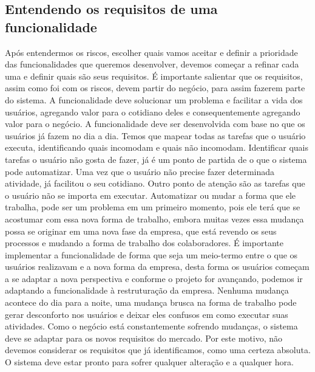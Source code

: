       \subsection{Entendendo os requisitos de uma funcionalidade}
        Após entendermos os riscos, escolher quais vamos aceitar e definir a prioridade
        das funcionalidades que queremos desenvolver, devemos começar a refinar cada
        uma e definir quais são seus requisitos. É importante salientar que os
        requisitos, assim como foi com os riscos, devem partir do negócio, para assim
        fazerem parte do sistema. A funcionalidade deve solucionar um problema e facilitar
        a vida dos usuários, agregando valor para o cotidiano deles e consequentemente
        agregando valor para o negócio. \newline
        A funcionalidade deve ser desenvolvida com base no que os usuários já fazem
        no dia a dia. Temos que mapear todas as tarefas que o usuário executa,
        identificando quais incomodam e quais não incomodam. Identificar quais tarefas
        o usuário não gosta de fazer, já é um ponto de partida de o que o sistema pode
        automatizar. Uma vez que o usuário não precise fazer determinada atividade,
        já facilitou o seu cotidiano. Outro ponto de atenção são as tarefas que
        o usuário não se importa em executar. Automatizar ou mudar a forma que ele
        trabalha, pode ser um problema em um primeiro momento, pois ele terá que
        se acostumar com essa nova forma de trabalho, embora muitas vezes essa mudança
        possa se originar em uma nova fase da empresa, que está revendo os seus processos
        e mudando a forma de trabalho dos colaboradores. É importante implementar
        a funcionalidade de forma que seja um meio-termo entre o que os usuários
        realizavam e a nova forma da empresa, desta forma os usuários começam a
        se adaptar a nova perspectiva e conforme o projeto for avançando, podemos
        ir adaptando a funcionalidade à restruturação da empresa. Nenhuma mudança
        acontece do dia para a noite, uma mudança brusca na forma de trabalho
        pode gerar desconforto nos usuários e deixar eles confusos em como executar
        suas atividades. \newline
        Como o negócio está constantemente sofrendo mudanças, o sistema deve se
        adaptar para os novos requisitos do mercado. Por este motivo, não devemos
        considerar os requisitos que já identificamos, como uma certeza absoluta.
        O sistema deve estar pronto para sofrer qualquer alteração e a qualquer hora.
